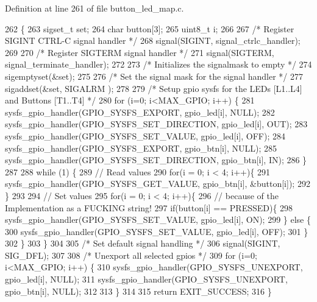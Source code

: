 Definition at line 261 of file button\-\_\-led\-\_\-map.\-c.


\begin{DoxyCode}
262 \{
263     sigset\_t set;
264     \textcolor{keywordtype}{char}    button[3];
265     uint8\_t i;
266 
267     \textcolor{comment}{/* Register SIGINT CTRL-C signal handler */}
268     signal(SIGINT, signal_ctrlc_handler);
269 
270     \textcolor{comment}{/* Register SIGTERM signal handler */}
271     signal(SIGTERM, signal_terminate_handler);
272 
273     \textcolor{comment}{/* Initializes the signalmask to empty */}
274     sigemptyset(&set);
275 
276     \textcolor{comment}{/* Set the signal mask for the signal handler */}
277     sigaddset(&set, SIGALRM );
278 
279     \textcolor{comment}{/* Setup gpio sysfs for the LEDs [L1..L4] and Buttons [T1..T4] */}
280     \textcolor{keywordflow}{for} (i=0; i<MAX_GPIO; i++) \{
281         sysfs_gpio_handler(GPIO_SYSFS_EXPORT, gpio_led[i], NULL);
282         sysfs_gpio_handler(GPIO_SYSFS_SET_DIRECTION, gpio_led[i], OUT);
283         sysfs_gpio_handler(GPIO_SYSFS_SET_VALUE, gpio_led[i], OFF);
284         sysfs_gpio_handler(GPIO_SYSFS_EXPORT, gpio_btn[i], NULL);
285         sysfs_gpio_handler(GPIO_SYSFS_SET_DIRECTION, gpio_btn[i], IN);
286     \}
287 
288     \textcolor{keywordflow}{while} (1) \{
289         \textcolor{comment}{// Read values}
290         \textcolor{keywordflow}{for}(i = 0; i < 4; i++)\{
291             sysfs_gpio_handler(GPIO_SYSFS_GET_VALUE, gpio_btn[i], &button[i]);
292         \}
293 
294         \textcolor{comment}{// Set values}
295         \textcolor{keywordflow}{for}(i = 0; i < 4; i++)\{
296             \textcolor{comment}{// because of the Implementation as a FUCKING string!}
297             \textcolor{keywordflow}{if}(button[i] == PRESSED)\{
298                 sysfs_gpio_handler(GPIO_SYSFS_SET_VALUE, gpio_led[i], ON);
299             \} \textcolor{keywordflow}{else} \{
300                 sysfs_gpio_handler(GPIO_SYSFS_SET_VALUE, gpio_led[i], OFF);
301             \}
302         \} 
303     \}  
304 
305     \textcolor{comment}{/* Set default signal handling */}
306     signal(SIGINT, SIG\_DFL);
307 
308     \textcolor{comment}{/* Unexport all selected gpios */}
309     \textcolor{keywordflow}{for} (i=0; i<MAX_GPIO; i++) \{
310         sysfs_gpio_handler(GPIO_SYSFS_UNEXPORT, gpio_led[i], NULL);
311         sysfs_gpio_handler(GPIO_SYSFS_UNEXPORT, gpio_btn[i], NULL);
312 
313     \}
314 
315     \textcolor{keywordflow}{return} EXIT\_SUCCESS;
316 \}
\end{DoxyCode}
